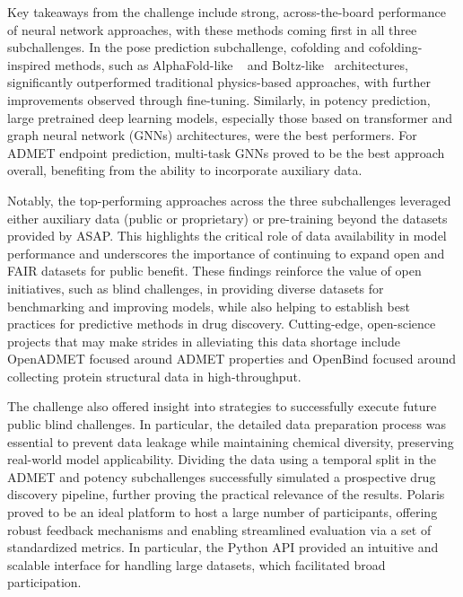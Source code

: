 \documentclass[journal=jcim,manuscript=article]{achemso}
\begin{document}
Key takeaways from the challenge include strong, across-the-board performance of neural network approaches, with these methods coming first in all three subchallenges. In the pose prediction subchallenge, cofolding and cofolding-inspired methods, such as AlphaFold-like ~\cite{abramson_2024_alphafold} and Boltz-like~\cite{wohlwend_2024_boltz-1, passaro_2025_boltz-2} architectures, significantly outperformed traditional physics-based approaches, with further improvements observed through fine-tuning. Similarly, in potency prediction, large pretrained deep learning models, especially those based on transformer and graph neural network (GNNs) architectures, were the best performers. For ADMET endpoint prediction, multi-task GNNs proved to be the best approach overall, benefiting from the ability to incorporate auxiliary data. 

Notably, the top-performing approaches across the three subchallenges leveraged either auxiliary data (public or proprietary) or pre-training beyond the datasets provided by ASAP. This highlights the critical role of data availability in model performance and underscores the importance of continuing to expand open and FAIR datasets for public benefit. These findings reinforce the value of open initiatives, such as blind challenges, in providing diverse datasets for benchmarking and improving models, while also helping to establish best practices for predictive methods in drug discovery. Cutting-edge, open-science projects that may make strides in alleviating this data shortage include OpenADMET focused around ADMET properties and OpenBind focused around collecting protein structural data in high-throughput.

The challenge also offered insight into strategies to successfully execute future public blind challenges. In particular, the detailed data preparation process was essential to prevent data leakage while maintaining chemical diversity, preserving real-world model applicability. Dividing the data using a temporal split in the ADMET and potency subchallenges successfully simulated a prospective drug discovery pipeline, further proving the practical relevance of the results.
Polaris proved to be an ideal platform to host a large number of participants, offering robust feedback mechanisms and enabling streamlined evaluation via a set of standardized metrics. In particular, the Python API provided an intuitive and scalable interface for handling large datasets, which facilitated broad participation. 
\end{document}
